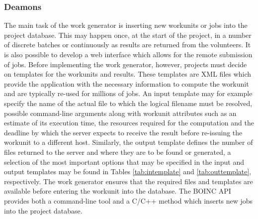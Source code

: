 \subsubsection{Deamons}
The main task of the work generator is inserting new workunits or jobs into the project database. This may happen once, at the start of the project, in a number of discrete batches or continuously as results are returned from the volunteers. It is also possible to develop a web interface which allows for the remote submission of jobs.
Before implementing the work generator, however, projects must decide on templates for the workunits and results. These templates are XML files which provide  the application with the necessary information to compute the workunit and are typically re-used for millions of jobs. 
An input template may for example specify the name of the actual file to which the logical filename must be resolved, possible command-line arguments along with workunit attributes such as an estimate of its execution time, the resources required for the computation and the deadline by which the server expects to receive the result before re-issuing the workunit to a different host.  
Similarly, the output template defines the number of files returned to the server and where they are to be found or generated, a selection of the most important options that may be specified in the input and output templates may be found in Tables \ref{tab:intemplate} and \ref{tab:outtemplate}, respectively. The work generator ensures that the required files and templates are available before entering the workunit into the database. The BOINC API provides both a command-line tool and  a C/C++ method which inserts new jobs into the project database.

